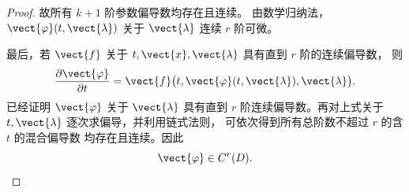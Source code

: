 \begin{proof}
	故所有 $k+1$ 阶参数偏导数均存在且连续。
	由数学归纳法，
	$\vect{\varphi}(t,\vect{\lambda})$ 关于
	$\vect{\lambda}$ 连续 $r$ 阶可微。
	
	最后，若 $\vect{f}$ 关于
	$t,\vect{x},\vect{\lambda}$ 具有直到 $r$ 阶的连续偏导数，
	则
	\[
	\frac{\partial\vect{\varphi}}{\partial t}
	=
	\vect{f}
	\bigl(
	t,\vect{\varphi}(t,\vect{\lambda}),\vect{\lambda}
	\bigr).
	\]
	已经证明 $\vect{\varphi}$ 关于 $\vect{\lambda}$
	具有直到 $r$ 阶连续偏导数。再对上式关于
	$t,\vect{\lambda}$ 逐次求偏导，并利用链式法则，
	可依次得到所有总阶数不超过 $r$ 的含 $t$ 的混合偏导数
	均存在且连续。因此
	\[
	\vect{\varphi}\in C^r(D).
	\]
\end{proof}
